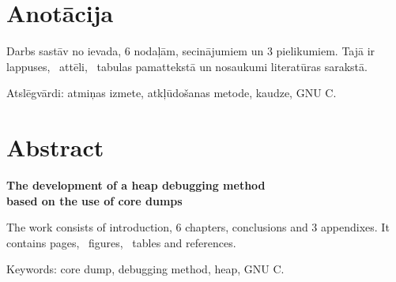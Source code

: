 \chapter*{Anotācija}
\thispagestyle{empty}
	

	Darbs sastāv no ievada, 6 nodaļām, secinājumiem un 3 pielikumiem. Tajā ir \pageref{LastPage} lappuses, \totfig\ attēli, \tottab\ tabulas pamattekstā un  nosaukumi literatūras sarakstā.

Atslēgvārdi: atmiņas izmete, atkļūdošanas metode, kaudze, GNU C.
\newpage
\chapter*{Abstract}
\begin{center}
\linespread{1.2}
\vspace{-0.3cm}
\large \textbf {The development of a heap debugging method \protect\\  based on the use of core dumps}
\end{center}

\thispagestyle{empty}
	The work consists of introduction, 6 chapters, conclusions and 3 appendixes. It contains \pageref{LastPage} pages, \totfig\ figures, \tottab\ tables and  references.

Keywords: core dump, debugging method, heap, GNU C.


\newpage 
